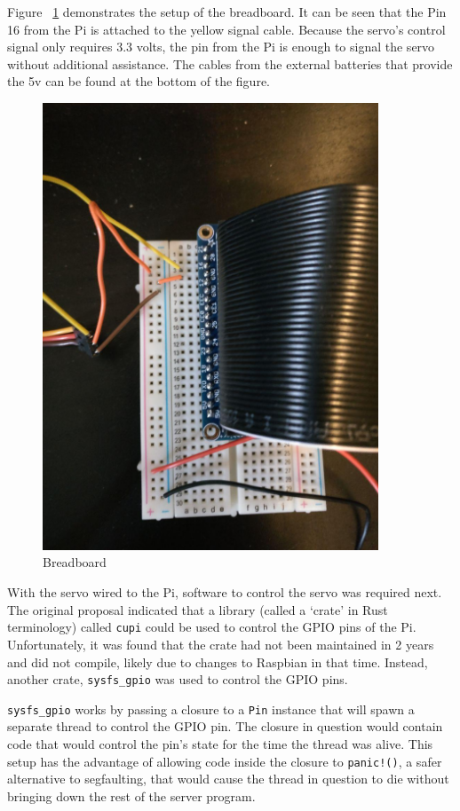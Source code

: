 \documentclass[a4paper]{article}
\begin{document}
Figure ~\ref{fig:breadboard} demonstrates the setup of the breadboard.
It can be seen that the Pin 16 from the Pi is attached to the yellow signal cable.
Because the servo's control signal only requires 3.3 volts, the pin from the Pi is enough to signal the servo without additional assistance.
The cables from the external batteries that provide the 5v can be found at the bottom of the figure.

\begin{figure}[H]
    \center
    \label{fig:breadboard}
    \caption{Breadboard}
    \includegraphics[width=10cm]{breadboard.jpg}
\end{figure}



With the servo wired to the Pi, software to control the servo was required next.
The original proposal indicated that a library (called a `crate' in Rust terminology) called \texttt{cupi} could be used to control the GPIO pins of the Pi.
Unfortunately, it was found that the crate had not been maintained in 2 years and did not compile, likely due to changes to Raspbian in that time.
Instead, another crate, \texttt{sysfs\_gpio} was used to control the GPIO pins.

\texttt{sysfs\_gpio} works by passing a closure to a \texttt{Pin} instance that will spawn a separate thread to control the GPIO pin.
The closure in question would contain code that would control the pin's state for the time the thread was alive.
This setup has the advantage of allowing code inside the closure to \texttt{panic!()}, a safer alternative to segfaulting, that would cause the thread in question to die without bringing down the rest of the server program.
\end{document}
